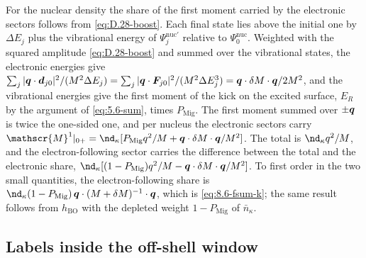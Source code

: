 For the nuclear density the share of the first moment carried by the electronic sectors follows from \cref{eq:D.28-boost}. Each final state lies above the initial one by $\Delta E_j$ plus the vibrational energy of $\Psi^{\mathrm{nuc}\prime}_j$ relative to $\Psi^{\mathrm{nuc}}_0$. Weighted with the squared amplitude \cref{eq:D.28-boost} and summed over the vibrational states, the electronic energies give $\sum_j|\bm{q}\cdot\bm{d}_{j0}|^2/(M^2\Delta E_j) = \sum_j|\bm{q}\cdot\bm{F}_{j0}|^2/(M^2\Delta E_j^3) = \bm{q}\cdot\delta M\cdot\bm{q}/2M^2$, and the vibrational energies give the first moment of the kick on the excited surface, $E_R$ by the argument of \cref{eq:5.6-sum}, times $P_{\mathrm{Mig}}$. The first moment summed over $\pm\bm{q}$ is twice the one-sided one, and per nucleus the electronic sectors carry $\mathscr{M}^1|_{0+} = \nd_\kappa[P_{\mathrm{Mig}}q^2/M + \vect{q}\cdot\delta M\cdot\vect{q}/M^2]$. The total is $\nd_\kappa q^2/M$, and the electron-following sector carries the difference between the total and the electronic share, $\nd_\kappa[(1 - P_{\mathrm{Mig}})q^2/M - \vect{q}\cdot\delta M\cdot\vect{q}/M^2]$. To first order in the two small quantities, the electron-following share is $\nd_\kappa(1 - P_{\mathrm{Mig}})\,\vect{q}\cdot(M + \delta M)^{-1}\cdot\vect{q}$, which is \cref{eq:8.6-fsum-k}; the same result follows from $h_{\mathrm{BO}}$ with the depleted weight $1 - P_{\mathrm{Mig}}$ of $\bar n_\kappa$.

\subsection{Labels inside the off-shell window}

